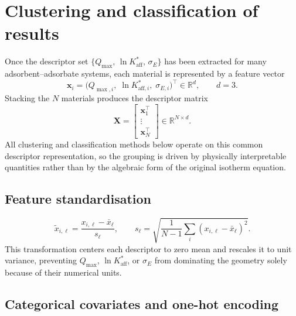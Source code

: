 \documentclass[journal=jacsat,manuscript=article]{achemso}
\begin{document}
\section{Clustering and classification of results}
\label{sec:si_clustering}

Once the descriptor set
$\{Q_{\max},\, \ln K_{\mathrm{aff}}^{\ast},\, \sigma_E\}$ has been
extracted for many adsorbent--adsorbate systems, each material is
represented by a feature vector
\begin{equation}
	\mathbf{x}_i
	=
	\bigl(
	Q_{\max,i},\;
	\ln K_{\mathrm{aff},i}^{\ast},\;
	\sigma_{E,i}
	\bigr)^\top
	\in \mathbb{R}^{d},
	\qquad d=3.
	\label{eq:si_feature_vector}
\end{equation}
Stacking the $N$ materials produces the descriptor matrix
\begin{equation}
	\mathbf{X}
	=
	\begin{bmatrix}
	\mathbf{x}_1^\top\\
	\vdots\\
	\mathbf{x}_N^\top
	\end{bmatrix}
	\in \mathbb{R}^{N\times d}.
	\label{eq:si_feature_matrix}
\end{equation}
All clustering and classification methods below operate on this common
descriptor representation, so the grouping is driven by physically
interpretable quantities rather than by the algebraic form of the
original isotherm equation.

\subsection{Feature standardisation}
\label{sec:si_standardisation}
\begin{equation}
	\tilde{x}_{i,\ell}
	= \frac{x_{i,\ell} - \bar{x}_\ell}{s_\ell},
	\qquad
	s_\ell = \sqrt{\frac{1}{N-1}\sum_{i}(x_{i,\ell} - \bar{x}_\ell)^2}.
	\label{eq:si_standardise}
\end{equation}
This transformation centers each descriptor to zero mean and rescales it
to unit variance, preventing $Q_{\max}$, $\ln K_{\mathrm{aff}}^{\ast}$,
or $\sigma_E$ from dominating the geometry solely because of their
numerical units.

\subsection{Categorical covariates and one-hot encoding}
\label{sec:si_onehot}
\end{document}
